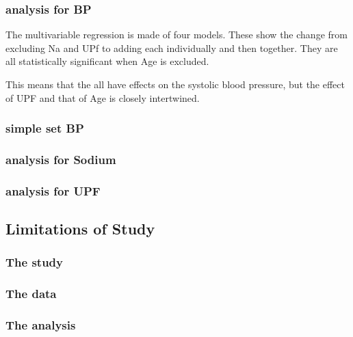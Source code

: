 \documentclass[
]{article}
\begin{document}
\hypertarget{analysis-for-bp}{%
\subsubsection{analysis for BP}\label{analysis-for-bp}}

The multivariable regression is made of four models. These show the
change from excluding Na and UPf to adding each individually and then
together. They are all statistically significant when Age is excluded.

This means that the all have effects on the systolic blood pressure, but
the effect of UPF and that of Age is closely intertwined.

\hypertarget{simple-set-bp}{%
\subsubsection{simple set BP}\label{simple-set-bp}}

\hypertarget{analysis-for-sodium}{%
\subsubsection{analysis for Sodium}\label{analysis-for-sodium}}

\hypertarget{analysis-for-upf}{%
\subsubsection{analysis for UPF}\label{analysis-for-upf}}

\hypertarget{limitations-of-study}{%
\subsection{Limitations of Study}\label{limitations-of-study}}

\hypertarget{the-study}{%
\subsubsection{The study}\label{the-study}}

\hypertarget{the-data-2}{%
\subsubsection{The data}\label{the-data-2}}

\hypertarget{the-analysis}{%
\subsubsection{The analysis}\label{the-analysis}}
\end{document}
